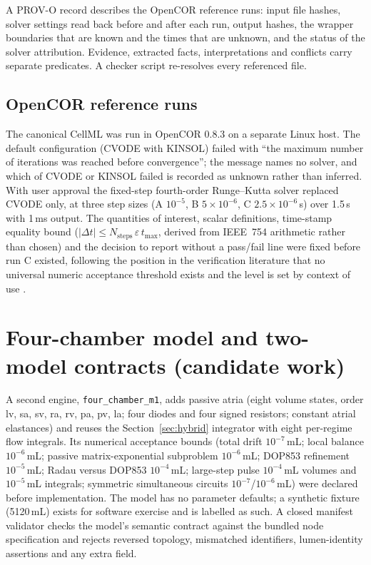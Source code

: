\documentclass[11pt,letterpaper]{article}
\newcommand{\pkg}[1]{\texttt{#1}}
\begin{document}
A PROV-O record \citep{provo2013} describes the OpenCOR reference runs: input file hashes, solver settings read back before and after each run, output hashes, the wrapper boundaries that are known and the times that are unknown, and the status of the solver attribution. Evidence, extracted facts, interpretations and conflicts carry separate predicates. A checker script re-resolves every referenced file.

\subsection{OpenCOR reference runs}
\label{sec:opencor}

The canonical CellML was run in OpenCOR 0.8.3 on a separate Linux host. The default configuration (CVODE with KINSOL) failed with ``the maximum number of iterations was reached before convergence''; the message names no solver, and which of CVODE or KINSOL failed is recorded as unknown rather than inferred. With user approval the fixed-step fourth-order Runge--Kutta solver replaced CVODE only, at three step sizes (A $10^{-5}$, B $5\times10^{-6}$, C $2.5\times10^{-6}$\,s) over 1.5\,s with 1\,ms output. The quantities of interest, scalar definitions, time-stamp equality bound ($|\Delta t|\le N_{\mathrm{steps}}\,\varepsilon\,t_{\max}$, derived from IEEE~754 arithmetic rather than chosen) and the decision to report without a pass/fail line were fixed before run C existed, following the position in the verification literature that no universal numeric acceptance threshold exists and the level is set by context of use \citep{pathmanathan2013reliability,pathmanathan2014verification,erdemir2020credible}.

\section{Four-chamber model and two-model contracts (candidate work)}
\label{sec:m1}

A second engine, \pkg{four\_chamber\_m1}, adds passive atria (eight volume states, order lv, sa, sv, ra, rv, pa, pv, la; four diodes and four signed resistors; constant atrial elastances) and reuses the Section~\ref{sec:hybrid} integrator with eight per-regime flow integrals. Its numerical acceptance bounds (total drift $10^{-7}$\,mL; local balance $10^{-6}$\,mL; passive matrix-exponential subproblem $10^{-6}$\,mL; DOP853 refinement $10^{-5}$\,mL; Radau versus DOP853 $10^{-4}$\,mL; large-step pulse $10^{-4}$\,mL volumes and $10^{-5}$\,mL integrals; symmetric simultaneous circuits $10^{-7}$/$10^{-6}$\,mL) were declared before implementation. The model has no parameter defaults; a synthetic fixture (5120\,mL) exists for software exercise and is labelled as such. A closed manifest validator checks the model's semantic contract against the bundled node specification and rejects reversed topology, mismatched identifiers, lumen-identity assertions and any extra field.
\end{document}
